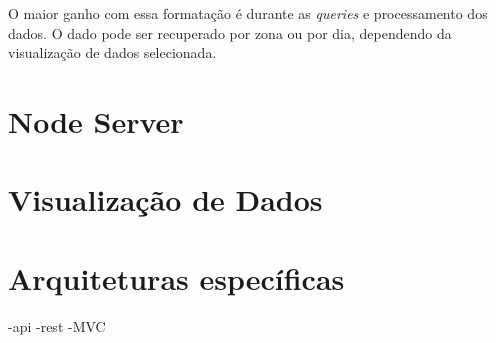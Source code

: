 O maior ganho com essa formatação é durante as \emph{queries} e processamento dos dados. O dado pode ser recuperado
por zona ou por dia, dependendo da visualização de dados selecionada.

\section{Node Server}
\label{node-server}


\section{Visualização de Dados}
\label{data-view}

\section{Arquiteturas específicas}
-api
-rest
-MVC
%
%
%
%
